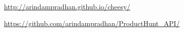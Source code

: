 \documentclass[]{deedy-resume-openfont}
\begin{document}
\begin{minipage}[t]{0.66\textwidth}
{ \url{http://arindampradhan.github.io/cheesy/} }\\
\sectionsep

{ \url{https://github.com/arindampradhan/ProductHunt_API/} }\\
\sectionsep


\end{minipage}
\end{document}
